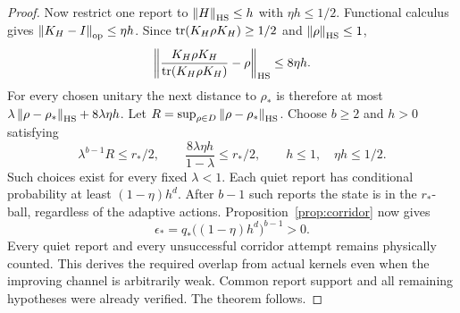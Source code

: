 \begin{proof}
Now restrict one report to $\left\lVert H\right\rVert_{\mathrm{HS}}\le h$ with $\eta h\le1/2$. Functional calculus gives $\left\lVert K_H-I\right\rVert_{\rm op}\le\eta h$. Since $\operatorname{tr}(K_H\rho K_H)\ge1/2$ and $\left\lVert\rho\right\rVert_{\mathrm{HS}}\le1$,
\[
 \left\|\frac{K_H\rho K_H}{\operatorname{tr}(K_H\rho K_H)}-\rho\right\|_{\mathrm{HS}}
 \le8\eta h.
\]
For every chosen unitary the next distance to $\rho_*$ is therefore at most
$\lambda\left\lVert\rho-\rho_*\right\rVert_{\mathrm{HS}}+8\lambda\eta h$.
Let $R=\sup_{\rho\in D}\left\lVert\rho-\rho_*\right\rVert_{\mathrm{HS}}$. Choose $b\ge2$ and $h>0$ satisfying
\begin{equation}\label{eq:quantum-corridor}
 \lambda^{b-1}R\le r_*/2,\qquad
 \frac{8\lambda\eta h}{1-\lambda}\le r_*/2,\qquad
 h\le1,\quad\eta h\le1/2.
\end{equation}
Such choices exist for every fixed $\lambda<1$. Each quiet report has conditional probability at least $(1-\eta)h^d$. After $b-1$ such reports the state is in the $r_*$-ball, regardless of the adaptive actions. Proposition~\ref{prop:corridor} now gives
\[
 \epsilon_*=q_*\bigl((1-\eta)h^d\bigr)^{b-1}>0.
\]
Every quiet report and every unsuccessful corridor attempt remains physically counted. This derives the required overlap from actual kernels even when the improving channel is arbitrarily weak. Common report support and all remaining hypotheses were already verified. The theorem follows.
\end{proof}

